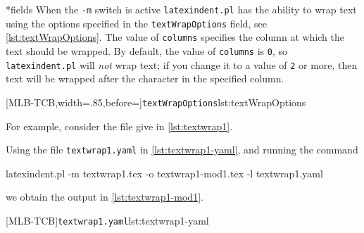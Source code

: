 	\begin{minipage}{.45\textwidth}
	\end{minipage}%
	\hfill
	\begin{minipage}{.45\textwidth}
	\end{minipage}

*{fields}
	When the \texttt{-m} switch is active \texttt{latexindent.pl} has the ability to wrap text using the options%
	 specified in the \texttt{textWrapOptions} field, see \cref{lst:textWrapOptions}.
	The value of \texttt{columns} specifies the column at which the text should be wrapped.
	By default, the value of \texttt{columns} is \texttt{0}, so \texttt{latexindent.pl} will \emph{not} wrap text; if you change it to a value of \texttt{2} or more, then text will be wrapped after the character in the specified column.

	[MLB-TCB,width=.85\linewidth,before=\centering]{\texttt{textWrapOptions}}{lst:textWrapOptions}

	For example, consider the file give in \cref{lst:textwrap1}.

	\begin{widepage}
	\end{widepage}

	Using the file \texttt{textwrap1.yaml} in \cref{lst:textwrap1-yaml}, and running the command \begin{commandshell}
latexindent.pl -m textwrap1.tex -o textwrap1-mod1.tex -l textwrap1.yaml
\end{commandshell} we obtain the output in \cref{lst:textwrap1-mod1}.

	\begin{minipage}{.45\linewidth}
	\end{minipage}
	\hfill
	\begin{minipage}{.45\linewidth}
		[MLB-TCB]{\texttt{textwrap1.yaml}}{lst:textwrap1-yaml}
	\end{minipage}

